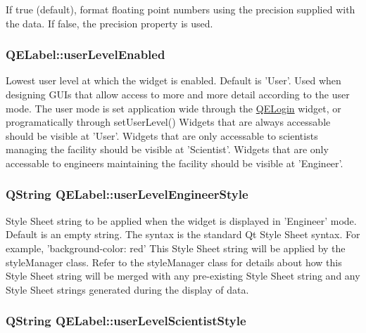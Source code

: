 \label{classQELabel_adcb309f27891b269748544992008af59}
If true (default), format floating point numbers using the precision supplied with the data. If false, the precision property is used. \hypertarget{classQELabel_aecfbc76bbf4cfdf829d5f3c25395a61c}{
\subsubsection[{userLevelEnabled}]{ QELabel::userLevelEnabled}}
\label{classQELabel_aecfbc76bbf4cfdf829d5f3c25395a61c}
Lowest user level at which the widget is enabled. Default is 'User'. Used when designing GUIs that allow access to more and more detail according to the user mode. The user mode is set application wide through the \hyperlink{classQELogin}{QELogin} widget, or programatically through setUserLevel() Widgets that are always accessable should be visible at 'User'. Widgets that are only accessable to scientists managing the facility should be visible at 'Scientist'. Widgets that are only accessable to engineers maintaining the facility should be visible at 'Engineer'. \hypertarget{classQELabel_af1b1e6b046a6aca87083ba33a1ee4adf}{
\subsubsection[{userLevelEngineerStyle}]{\setlength{\rightskip}{0pt plus 5cm}QString QELabel::userLevelEngineerStyle}}
\label{classQELabel_af1b1e6b046a6aca87083ba33a1ee4adf}
Style Sheet string to be applied when the widget is displayed in 'Engineer' mode. Default is an empty string. The syntax is the standard Qt Style Sheet syntax. For example, 'background-\/color: red' This Style Sheet string will be applied by the styleManager class. Refer to the styleManager class for details about how this Style Sheet string will be merged with any pre-\/existing Style Sheet string and any Style Sheet strings generated during the display of data. \hypertarget{classQELabel_a0db32f7f413a0f90922bf905457e84ff}{
\subsubsection[{userLevelScientistStyle}]{\setlength{\rightskip}{0pt plus 5cm}QString QELabel::userLevelScientistStyle}}
